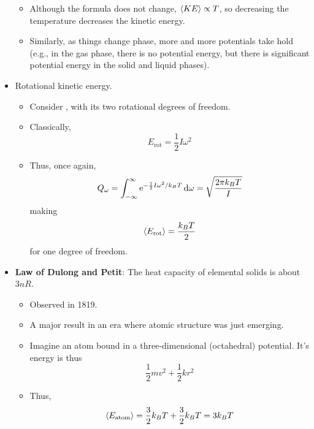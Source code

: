 \documentclass[../notes.tex]{subfiles}
\begin{document}
\begin{itemize}
    \begin{itemize}
        \item Although the formula does not change, $\prb{KE}\propto T$, so decreasing the temperature decreases the kinetic energy.
        \item Similarly, as things change phase, more and more potentials take hold (e.g., in the gas phase, there is no potential energy, but there is significant potential energy in the solid and liquid phases).
    \end{itemize}
    \item Rotational kinetic energy.
    \begin{itemize}
        \item Consider , with its two rotational degrees of freedom.
        \item Classically,
        \begin{equation*}
            E_\text{rot} = \frac{1}{2}I\omega^2
        \end{equation*}
        \item Thus, once again,
        \begin{equation*}
            Q_\omega = \int_{-\infty}^\infty\e[-\frac{1}{2}I\omega^2/k_BT]\dd{\omega}
            = \sqrt{\frac{2\pi k_BT}{I}}
        \end{equation*}
        making
        \begin{equation*}
            \prb{E_\text{rot}} = \frac{k_BT}{2}
        \end{equation*}
        for one degree of freedom.
    \end{itemize}
    \item \textbf{Law of Dulong and Petit}: The heat capacity of elemental solids is about $3nR$.
    \begin{itemize}
        \item Observed in 1819.
        \item A major result in an era where atomic structure was just emerging.
        \item Imagine an atom bound in a three-dimensional (octahedral) potential. It's energy is thus
        \begin{equation*}
            \frac{1}{2}mv^2+\frac{1}{2}kr^2
        \end{equation*}
        \item Thus,
        \begin{align*}
            \prb{E_\text{atom}} &= \frac{3}{2}k_BT+\frac{3}{2}k_BT = 3k_BT\\

\end{align*}
\end{itemize}
\end{itemize}
\end{document}

